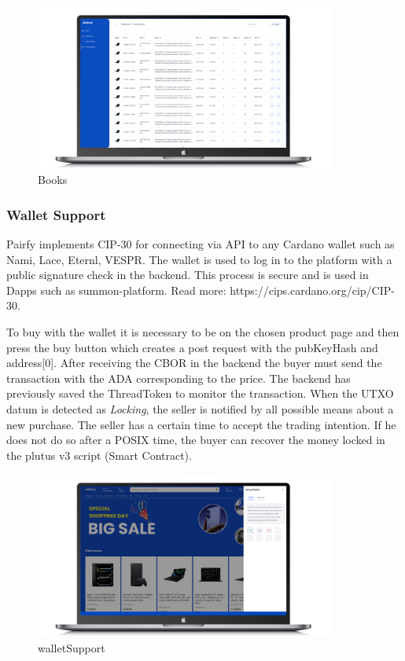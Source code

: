 \documentclass[12pt]{article}
\begin{document}
\begin{figure}[ht]
  \centering
  \includegraphics[width=0.88\textwidth, keepaspectratio]{product-books.png}
  \caption{Books}
  \label{fig:web}
\end{figure}

\subsubsection { Wallet Support } 

Pairfy implements CIP-30 for connecting via API to any Cardano wallet such as Nami, Lace, Eternl, VESPR. The wallet is used to log in to the platform with a public signature check in the backend. This process is secure and is used in Dapps such as summon-platform. Read more: https://cips.cardano.org/cip/CIP-30.

To buy with the wallet it is necessary to be on the chosen product page and then press the buy button which creates a post request with the pubKeyHash and address[0]. After receiving the CBOR in the backend the buyer must send the transaction with the ADA corresponding to the price. The backend has previously saved the ThreadToken to monitor the transaction. When the UTXO datum is detected as  \emph{Locking}, the seller is notified by all possible means about a new purchase. The seller has a certain time to accept the trading intention. If he does not do so after a POSIX time, the buyer can recover the money locked in the plutus v3 script (Smart Contract).

\begin{figure}[ht]
  \centering
  \includegraphics[width=0.88\textwidth, keepaspectratio]{walletSupport.png}
  \caption{walletSupport}
  \label{fig:web}
\end{figure}
\end{document}
